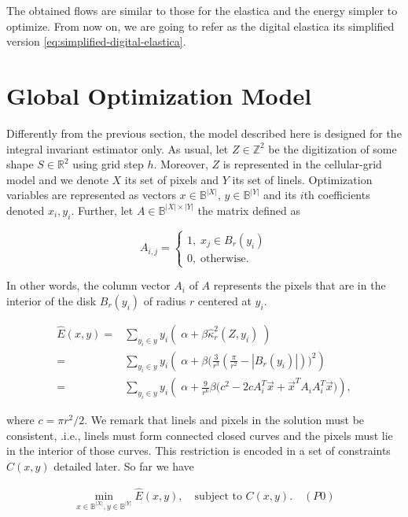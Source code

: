 The obtained flows are similar to those for the elastica and the energy simpler to optimize. From now on, we are going to refer as the digital elastica its simplified version \eqref{eq:simplified-digital-elastica}.

\section{Global Optimization Model}

Differently from the previous section, the model described here is designed for the integral invariant estimator only. As usual, let $Z \in \mathbb{Z}^2$ be the digitization of some shape $S \in \mathbb{R}^2$ using grid step $h$. Moreover, $Z$ is represented in the cellular-grid model and we denote $X$ its set of pixels and $Y$ its set of linels. Optimization variables are represented as vectors $x \in \mathbb{B}^{|X|},\, y \in \mathbb{B}^{|Y|}$ and its $i$th coefficients denoted  $x_i,y_i$.  Further, let $A \in \mathbb{B}^{|X|\times |Y|}$ the matrix defined as

\[
	A_{i,j} = \left\{ \begin{array}{ll}
		1,\; x_j \in B_r(y_i)\\
		0,\; \text{otherwise}.
	\end{array}\right.
\]

In other words, the column vector $A_i$ of $A$ represents the pixels that are in the interior of  the disk $B_r(y_i)$ of radius $r$ centered at $y_i$.


\begin{align}
	\hat{E}(x,y) =& \sum_{y_i \in y}{ y_i \left(\; \alpha + \beta \hat{\kappa}_{r}^2(Z,y_i) \; \right)}\\\nonumber
			   =& \sum_{y_i \in y}{ y_i \left(\; \alpha  + \beta \big( \frac{3}{r^3}(\frac{\pi}{r^2} - |B_r(y_i)|)\big)^2\right)}\\\nonumber
			   =& \sum_{y_i \in y}{ y_i \left(\; \alpha + \frac{9}{r^6}\beta \big(c^2 - 2cA_i^T\vec{x} + \vec{x}^TA_iA_i^T\vec{x}\big)\right)},			   
	\end{align}
	
where $c =  \pi r^2/2$. We remark that linels and pixels in the solution must be consistent, .i.e., linels must form connected closed curves and the pixels must lie in the interior of those curves. This restriction is encoded in a set of constraints $C(x,y)$ detailed later. So far we have

\begin{align*}
	\min_{x \in \mathbb{B}^{|X|}, y \in \mathbb{B}^{|Y|}}{\hat{E}(x,y)}, \quad \text{subject to } C(x,y). \quad (P0)
\end{align*}

